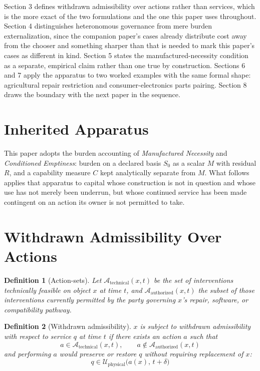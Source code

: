 \documentclass[11pt]{article}
\newtheorem{definition}{Definition}[section]
\begin{document}
Section 3 defines withdrawn admissibility over actions rather than services, which is the more exact of the two formulations and the one this paper uses throughout. Section 4 distinguishes heteronomous governance from mere burden externalization, since the companion paper's cases already distribute cost away from the chooser and something sharper than that is needed to mark this paper's cases as different in kind. Section 5 states the manufactured-necessity condition as a separate, empirical claim rather than one true by construction. Sections 6 and 7 apply the apparatus to two worked examples with the same formal shape: agricultural repair restriction and consumer-electronics parts pairing. Section 8 draws the boundary with the next paper in the sequence.

\section{Inherited Apparatus}

This paper adopts the burden accounting of \emph{Manufactured Necessity} and \emph{Conditioned Emptiness}: burden on a declared basis $S_0$ as a scalar $M$ with residual $R$, and a capability measure $C$ kept analytically separate from $M$. What follows applies that apparatus to capital whose construction is not in question and whose use has not merely been underrun, but whose continued service has been made contingent on an action its owner is not permitted to take.

\section{Withdrawn Admissibility Over Actions}

\begin{definition}[Action-sets]
Let $\mathcal{A}_{\text{technical}}(x,t)$ be the set of interventions technically feasible on object $x$ at time $t$, and $\mathcal{A}_{\text{authorized}}(x,t)$ the subset of those interventions currently permitted by the party governing $x$'s repair, software, or compatibility pathway.
\end{definition}

\begin{definition}[Withdrawn admissibility]
$x$ is subject to withdrawn admissibility with respect to service $q$ at time $t$ if there exists an action $a$ such that
\[
a \in \mathcal{A}_{\text{technical}}(x,t), \qquad a \notin \mathcal{A}_{\text{authorized}}(x,t)
\]
and performing $a$ would preserve or restore $q$ without requiring replacement of $x$:
\[
q \in \mathcal{U}_{\text{physical}}\big(a(x),\, t+\delta\big)
\]
\end{definition}
\end{document}
